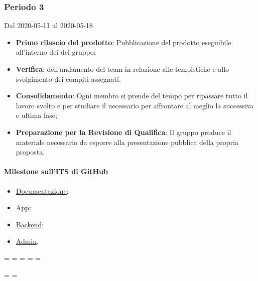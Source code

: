 \subsubsection{Periodo 3}
Dal 2020-05-11 al 2020-05-18
\begin{itemize}
	\item \textbf{Primo rilascio del prodotto}: Pubblicazione del prodotto eseguibile all'interno dei  del gruppo;
	\item \textbf{Verifica}:  dell'andamento del team in relazione alle tempistiche e allo svolgimento dei compiti assegnati.
	\item \textbf{Consolidamento}: Ogni membro si prende del tempo per ripassare tutto il lavoro svolto e per studiare il necessario per affrontare al meglio la successiva e ultima fase;
	\item \textbf{Preparazione per la Revisione di Qualifica}: Il gruppo produce il materiale necessario da esporre alla presentazione pubblica della propria proposta.
\end{itemize}
\paragraph{Milestone sull'ITS di GitHub}
\begin{itemize}
	\item \href{https://github.com/qb-team/Stalker-Documentazione/milestone/13}{Documentazione};
	\item \href{https://github.com/qb-team/Stalker-App/milestone/3}{App};
	\item \href{https://github.com/qb-team/Stalker-Backend/milestone/3}{Backend};
	\item \href{https://github.com/qb-team/Stalker-Admin/milestone/3}{Admin}.
\end{itemize}

\newpage
\paperwidth=\pdfpageheight
\paperheight=\pdfpagewidth
\pdfpageheight=\paperheight
\pdfpagewidth=\paperwidth
\headwidth=\textheight

\begingroup 
\vsize=\textwidth
\hsize=\textheight

